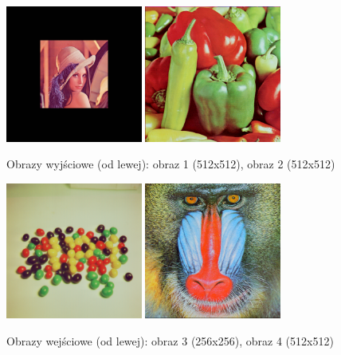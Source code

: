 \documentclass[final,a4paper,openany,12pt]{mwbk}
\begin{document}
\begin{figure}[H]
	\begin{center}
		\includegraphics[width=0.4\textwidth]{lena_color_unificationGeo_result}
		\includegraphics[width=0.4\textwidth]{peppers_color_unificationGeo_result}
	\end{center}
	\caption{Obrazy wyjściowe (od lewej): obraz 1 (512x512), obraz 2 (512x512)}
\end{figure}

\begin{figure}[H]
	\begin{center}
		\includegraphics[width=0.4\textwidth]{candy_color}
		\includegraphics[width=0.4\textwidth]{mandrill_color}
	\end{center}
	\caption{Obrazy wejściowe (od lewej): obraz 3 (256x256), obraz 4 (512x512)}
\end{figure}
\end{document}
